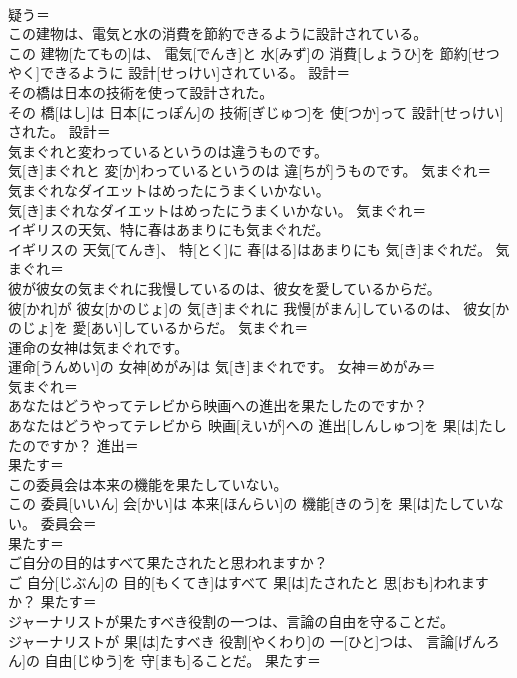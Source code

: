\documentclass[8pt]{extreport}
\begin{document}
\begin{CJK}{UTF8}{min}
\\	疑う＝ 
\\	この建物は、電気と水の消費を節約できるように設計されている。	
\\	この 建物[たてもの]は、 電気[でんき]と 水[みず]の 消費[しょうひ]を 節約[せつやく]できるように 設計[せっけい]されている。	設計＝ 
\\	その橋は日本の技術を使って設計された。	
\\	その 橋[はし]は 日本[にっぽん]の 技術[ぎじゅつ]を 使[つか]って 設計[せっけい]された。	設計＝ 
\\	気まぐれと変わっているというのは違うものです。	
\\	気[き]まぐれと 変[か]わっているというのは 違[ちが]うものです。	気まぐれ＝ 
\\	気まぐれなダイエットはめったにうまくいかない。	
\\	気[き]まぐれなダイエットはめったにうまくいかない。	気まぐれ＝ 
\\	イギリスの天気、特に春はあまりにも気まぐれだ。	
\\	イギリスの 天気[てんき]、 特[とく]に 春[はる]はあまりにも 気[き]まぐれだ。	気まぐれ＝ 
\\	彼が彼女の気まぐれに我慢しているのは、彼女を愛しているからだ。	
\\	彼[かれ]が 彼女[かのじょ]の 気[き]まぐれに 我慢[がまん]しているのは、 彼女[かのじょ]を 愛[あい]しているからだ。	気まぐれ＝ 
\\	運命の女神は気まぐれです。	
\\	運命[うんめい]の 女神[めがみ]は 気[き]まぐれです。	女神＝めがみ＝ 
\\	気まぐれ＝ 
\\	あなたはどうやってテレビから映画への進出を果たしたのですか？	
\\	あなたはどうやってテレビから 映画[えいが]への 進出[しんしゅつ]を 果[は]たしたのですか？	進出＝ 
\\	果たす＝ 
\\	この委員会は本来の機能を果たしていない。	
\\	この 委員[いいん] 会[かい]は 本来[ほんらい]の 機能[きのう]を 果[は]たしていない。	委員会＝ 
\\	果たす＝ 
\\	ご自分の目的はすべて果たされたと思われますか？	
\\	ご 自分[じぶん]の 目的[もくてき]はすべて 果[は]たされたと 思[おも]われますか？	果たす＝ 
\\	ジャーナリストが果たすべき役割の一つは、言論の自由を守ることだ。	
\\	ジャーナリストが 果[は]たすべき 役割[やくわり]の 一[ひと]つは、 言論[げんろん]の 自由[じゆう]を 守[まも]ることだ。	果たす＝ 

\end{CJK}
\end{document}
